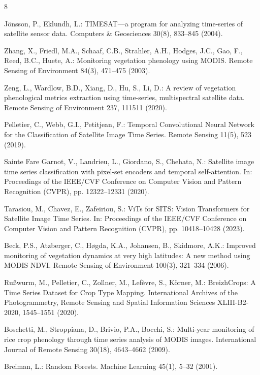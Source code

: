 \documentclass[runningheads]{llncs}
\begin{document}
\begin{thebibliography}{8}

J\"onsson, P., Eklundh, L.: TIMESAT---a program for analyzing time-series of satellite sensor data. Computers \& Geosciences 30(8), 833--845 (2004).

Zhang, X., Friedl, M.A., Schaaf, C.B., Strahler, A.H., Hodges, J.C., Gao, F., Reed, B.C., Huete, A.: Monitoring vegetation phenology using MODIS. Remote Sensing of Environment 84(3), 471--475 (2003).

Zeng, L., Wardlow, B.D., Xiang, D., Hu, S., Li, D.: A review of vegetation phenological metrics extraction using time-series, multispectral satellite data. Remote Sensing of Environment 237, 111511 (2020).

Pelletier, C., Webb, G.I., Petitjean, F.: Temporal Convolutional Neural Network for the Classification of Satellite Image Time Series. Remote Sensing 11(5), 523 (2019).

Sainte Fare Garnot, V., Landrieu, L., Giordano, S., Chehata, N.: Satellite image time series classification with pixel-set encoders and temporal self-attention. In: Proceedings of the IEEE/CVF Conference on Computer Vision and Pattern Recognition (CVPR), pp. 12322--12331 (2020).

Tarasiou, M., Chavez, E., Zafeiriou, S.: ViTs for SITS: Vision Transformers for Satellite Image Time Series. In: Proceedings of the IEEE/CVF Conference on Computer Vision and Pattern Recognition (CVPR), pp. 10418--10428 (2023).

Beck, P.S., Atzberger, C., H{\o}gda, K.A., Johansen, B., Skidmore, A.K.: Improved monitoring of vegetation dynamics at very high latitudes: A new method using MODIS NDVI. Remote Sensing of Environment 100(3), 321--334 (2006).

Ru\ss wurm, M., Pelletier, C., Zollner, M., Lef\`evre, S., K\"orner, M.: BreizhCrops: A Time Series Dataset for Crop Type Mapping. International Archives of the Photogrammetry, Remote Sensing and Spatial Information Sciences XLIII-B2-2020, 1545--1551 (2020).

Boschetti, M., Stroppiana, D., Brivio, P.A., Bocchi, S.: Multi-year monitoring of rice crop phenology through time series analysis of MODIS images. International Journal of Remote Sensing 30(18), 4643--4662 (2009).

Breiman, L.: Random Forests. Machine Learning 45(1), 5--32 (2001).


\end{thebibliography}
\end{document}
